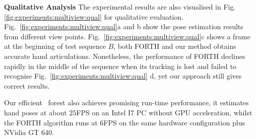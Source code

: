\noindent \textbf{Qualitative Analysis} 
The experimental results are also visualised in Fig. \ref{fig:experiments:multiview:qual} for qualitative evaluation. 
Fig.~\ref{fig:experiments:multiview:qual}a and b show the pose estimation results from different view points.    
Fig.~\ref{fig:experiments:multiview:qual}c shows a frame at the beginning of test sequence $B$, both FORTH and our method obtains accurate hand articulations. Nonetheless, the performance of FORTH declines rapidly in the middle of the sequence when its tracking is lost and failed to recognise Fig.~\ref{fig:experiments:multiview:qual} d, yet our approach still gives correct results. 

Our efficient \STR\ forest also achieves promising run-time performance, it estimates hand poses at about $25$FPS on an Intel I7 PC without GPU acceleration, whilst the FORTH algorithm runs at $6$FPS on the same hardware configuration plus NVidia GT 640. 



